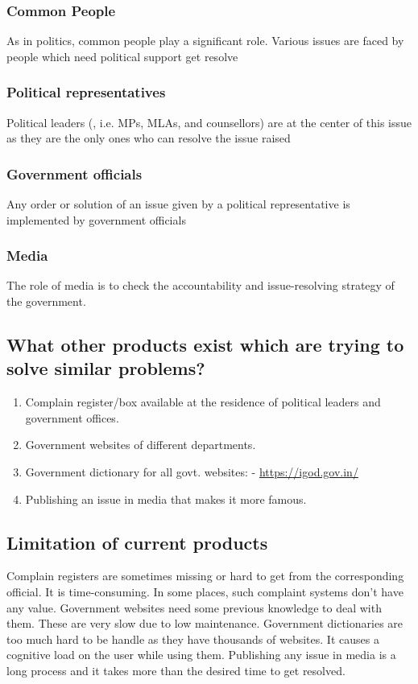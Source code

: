 \documentclass[acmtog]{acmart}
\begin{document}
\subsubsection{Common People}
As in politics, common people play a significant role. Various issues are faced by people which need political support get resolve
\subsubsection{Political representatives}
Political leaders (, i.e. MPs, MLAs, and counsellors) are at the center of this issue as they are the only ones who can resolve the issue raised
\subsubsection{Government officials}
Any order or solution of an issue given by a political representative is implemented by government officials
\subsubsection{Media}
The role of media is to check the accountability and issue-resolving strategy of the government.

\subsection{What other products exist which are trying to solve similar problems?}
\begin{enumerate}
    \item Complain register/box available at the residence of political leaders and government offices.
    \item Government websites of different departments.
    \item Government dictionary for all govt. websites: - \url{https://igod.gov.in/}
    \item Publishing an issue in media that makes it more famous. 
\end{enumerate}

\subsection{Limitation of current products}
Complain registers are sometimes missing or hard to get from the corresponding official. It is time-consuming. In some places, such complaint systems don’t have any value.
Government websites need some previous knowledge to deal with them. These are very slow due to low maintenance.
Government dictionaries are too much hard to be handle as they have thousands of websites. It causes a cognitive load on the user while using them.
Publishing any issue in media is a long process and it takes more than the desired time to get resolved.
\end{document}
